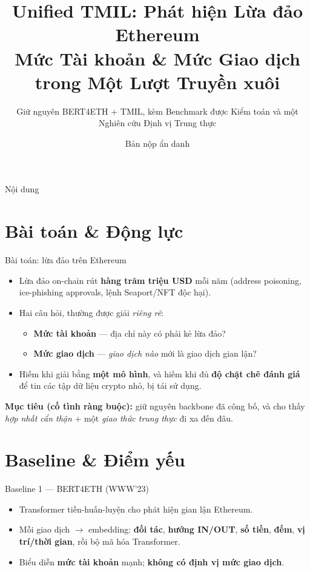 \documentclass[aspectratio=169,10pt]{beamer}
\title[Unified TMIL --- Phishing ETH]{Unified TMIL: Phát hiện Lừa đảo Ethereum\\Mức Tài khoản \& Mức Giao dịch trong Một Lượt Truyền xuôi}
\subtitle{Giữ nguyên BERT4ETH + TMIL, kèm Benchmark được Kiểm toán và một Nghiên cứu Định vị Trung thực}
\author{Bản nộp ẩn danh}
\date{}
\begin{document}
\begin{frame}\titlepage\end{frame}
\begin{frame}{Nội dung}\tableofcontents\end{frame}

\section{Bài toán \& Động lực}
\begin{frame}{Bài toán: lừa đảo trên Ethereum}
\begin{itemize}
\item Lừa đảo on-chain rút \textbf{hàng trăm triệu USD} mỗi năm (address poisoning, ice-phishing approvals, lệnh Seaport/NFT độc hại).
\item Hai câu hỏi, thường được giải \emph{riêng rẽ}:
\begin{itemize}
\item \textbf{Mức tài khoản} --- địa chỉ này có phải kẻ lừa đảo?
\item \textbf{Mức giao dịch} --- \emph{giao dịch nào} mới là giao dịch gian lận?
\end{itemize}
\item Hiếm khi giải bằng \textbf{một mô hình}, và hiếm khi đủ \textbf{độ chặt chẽ đánh giá} để tin các tập dữ liệu crypto nhỏ, bị tái sử dụng.
\end{itemize}
\vfill
\textbf{Mục tiêu (cố tình ràng buộc):} giữ nguyên backbone đã công bố, và cho thấy \emph{hợp nhất cẩn thận} + một \emph{giao thức trung thực} đi xa đến đâu.
\end{frame}

\section{Baseline \& Điểm yếu}
\begin{frame}{Baseline 1 --- BERT4ETH (WWW'23)}
\begin{itemize}
\item Transformer tiền-huấn-luyện cho phát hiện gian lận Ethereum.
\item Mỗi giao dịch $\to$ embedding: \textbf{đối tác}, \textbf{hướng IN/OUT}, \textbf{số tiền}, \textbf{đếm}, \textbf{vị trí/thời gian}, rồi bộ mã hóa Transformer.
\item Biểu diễn \textbf{mức tài khoản} mạnh; \textbf{không có định vị mức giao dịch}.
\end{itemize}
\end{frame}
\end{document}

